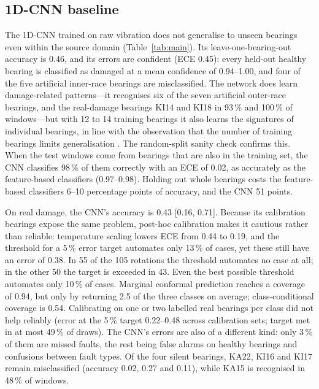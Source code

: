 

\subsection{1D-CNN baseline}
\label{sec:cnnresults}

The 1D-CNN trained on raw vibration does not generalise to unseen bearings even within the source domain
(Table~\ref{tab:main}). Its leave-one-bearing-out accuracy is 0.46, and its errors are confident (ECE 0.45): every
held-out healthy bearing is classified as damaged at a mean confidence of 0.94--1.00, and four of the five artificial
inner-race bearings are misclassified. The network does learn damage-related patterns---it recognises six of the
seven artificial outer-race bearings, and the real-damage bearings KI14 and KI18 in 93\,\% and 100\,\% of
windows---but with 12 to 14 training bearings it also learns the signatures of individual bearings, in line with the
observation that the number of training bearings limits generalisation \citep{vieira2026}. The random-split sanity
check confirms this. When the test windows come from bearings that are also in the training set, the CNN classifies
98\,\% of them correctly with an ECE of 0.02, as accurately as the feature-based classifiers (0.97--0.98). Holding
out whole bearings costs the feature-based classifiers 6--10 percentage points of accuracy, and the CNN 51 points.

On real damage, the CNN's accuracy is 0.43 [0.16, 0.71]. Because its calibration bearings expose the same problem,
post-hoc calibration makes it cautious rather than reliable: temperature scaling lowers ECE from 0.44 to 0.19, and the
threshold for a 5\,\% error target automates only 13\,\% of cases, yet these still have an error of 0.38. In 55 of the
105 rotations the threshold automates no case at all; in the other 50 the target is exceeded in 43. Even the best
possible threshold automates only 10\,\% of cases.
Marginal conformal prediction reaches a coverage of 0.94, but only by returning 2.5 of the three classes on average;
class-conditional coverage is 0.54. Calibrating on one or two labelled real bearings per class did not help reliably
(error at the 5\,\% target 0.22--0.48 across calibration sets; target met in at most 49\,\% of draws). The CNN's
errors are also of a different kind: only 3\,\% of them are missed faults, the rest being false alarms on healthy
bearings and confusions between fault types. Of the four silent bearings, KA22, KI16 and KI17 remain misclassified
(accuracy 0.02, 0.27 and 0.11), while KA15 is recognised in 48\,\% of windows.

